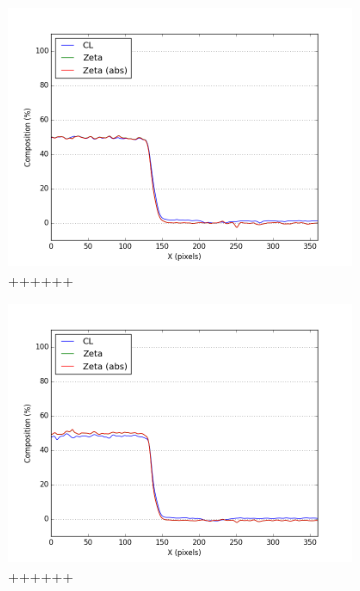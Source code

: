 \begin{figure}
	\begin{subfigure}{.5\textwidth}
		\centering
		\includegraphics[width=\linewidth]{fig/q/1_ga2}
		\caption{++++++}
		\label{fig:zeta_area1_ga}
	\end{subfigure}%
	\begin{subfigure}{.5\textwidth}
		\centering
		\includegraphics[width=\linewidth]{fig/q/1_as2}
		\caption{++++++}
		\label{fig:zeta_area1_as}
	\end{subfigure}
		\begin{subfigure}{.5\textwidth}
			\centering

\end{subfigure}
\end{figure}
